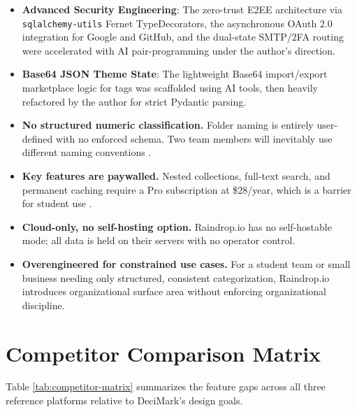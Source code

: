 \documentclass[11pt,a4paper]{book}
\begin{document}
\begin{itemize}
  \item \textbf{Advanced Security Engineering}: The zero-trust E2EE architecture via \texttt{sqlalchemy-utils} Fernet TypeDecorators, the asynchronous OAuth 2.0 integration for Google and GitHub, and the dual-state SMTP/2FA routing were accelerated with AI pair-programming under the author's direction.
  \item \textbf{Base64 JSON Theme State}: The lightweight Base64 import/export marketplace logic for tags was scaffolded using AI tools, then heavily refactored by the author for strict Pydantic parsing.

  \item \textbf{No structured numeric classification.} Folder naming is entirely user-defined with no enforced schema. Two team members will inevitably use different naming conventions \citep{jones2007keeping}.
  \item \textbf{Key features are paywalled.} Nested collections, full-text search, and permanent caching require a Pro subscription at \$28/year, which is a barrier for student use \citep{raindropio2024}.
  \item \textbf{Cloud-only, no self-hosting option.} Raindrop.io has no self-hostable mode; all data is held on their servers with no operator control.
  \item \textbf{Overengineered for constrained use cases.} For a student team or small business needing only structured, consistent categorization, Raindrop.io introduces organizational surface area without enforcing organizational discipline.
\end{itemize}

\section{Competitor Comparison Matrix}

Table \ref{tab:competitor-matrix} summarizes the feature gaps across all three reference platforms relative to DeciMark's design goals.
\end{document}
